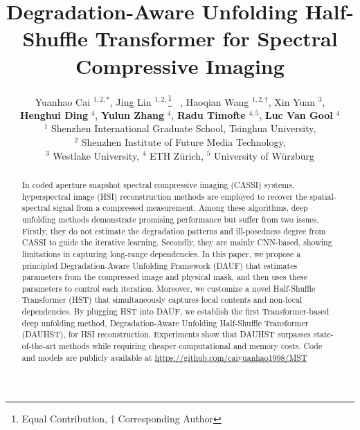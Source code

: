 \documentclass{article}
\title{Degradation-Aware Unfolding Half-Shuffle Transformer  for  Spectral Compressive Imaging}
\author{Yuanhao Cai $^{1,2,*}$, Jing Lin $^{1,2,}$\thanks{Equal Contribution, $\dagger$ Corresponding Author} ~, Haoqian Wang $^{1,2,\dagger}$, Xin Yuan $^3$, \\ \textbf{Henghui Ding} $^4$, \textbf{Yulun Zhang} $^4$, \textbf{Radu Timofte} $^{4,5}$,  \textbf{Luc Van Gool} $^4$ \\
	$^{1}$ Shenzhen International Graduate School, Tsinghua University, \\ $^2$  Shenzhen Institute of Future Media Technology, \\ $^3$ Westlake University, $^4$ ETH Z\"{u}rich, $^5$ University of W\"urzburg
}
\begin{document}
\maketitle

\vspace{-5.5mm}
\begin{abstract}
	\vspace{-3mm}
	In coded aperture snapshot spectral compressive imaging (CASSI) systems, hyperspectral image (HSI) reconstruction methods are employed to recover the spatial-spectral signal from a compressed measurement. Among these algorithms, deep unfolding methods demonstrate promising performance but suffer from two issues. Firstly, they do not estimate the degradation patterns and ill-posedness degree from CASSI to guide the iterative learning. Secondly, they are mainly CNN-based, showing limitations in capturing long-range dependencies. In this paper, we propose a  principled Degradation-Aware Unfolding Framework (DAUF) that estimates parameters from the compressed image and physical mask, and then uses these parameters to control each iteration. Moreover,  we customize a novel Half-Shuffle Transformer (HST) that simultaneously captures local contents and non-local dependencies. By plugging HST into DAUF, we establish the first Transformer-based deep unfolding method, Degradation-Aware  Unfolding Half-Shuffle Transformer (DAUHST), for HSI reconstruction. Experiments show that DAUHST surpasses state-of-the-art methods while requiring cheaper computational and memory costs. Code and models are publicly available at   \url{https://github.com/caiyuanhao1998/MST}
\end{abstract}

\vspace{-1mm}
\end{document}

